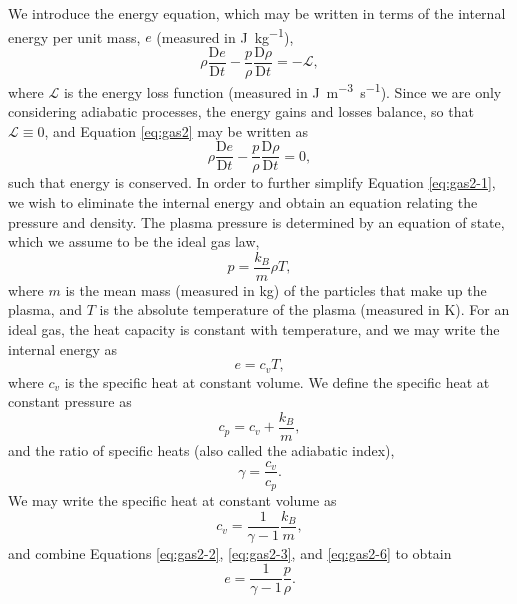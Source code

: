 We introduce the energy equation, which may be written in terms of the internal energy per unit mass, $e$ (measured in \si{J.kg^{-1}}),
%
\begin{equation}
\label{eq:gas2}
\rho \frac{\mathrm{D} e}{\mathrm{D} t} - \frac{p}{\rho} \frac{\mathrm{D} \rho}{\mathrm{D} t} = - \mathcal{L},
\end{equation}
%
where $\mathcal{L}$ is the energy loss function (measured in \si{J.m^{-3}.s^{-1}}).
Since we are only considering adiabatic processes, the energy gains and losses balance, so that $\mathcal{L} \equiv 0$, and Equation \eqref{eq:gas2} may be written as
%
\begin{equation}
\label{eq:gas2-1}
\rho \frac{\mathrm{D} e}{\mathrm{D} t} - \frac{p}{\rho} \frac{\mathrm{D} \rho}{\mathrm{D} t} = 0,
\end{equation}
%
such that energy is conserved.
In order to further simplify Equation \eqref{eq:gas2-1}, we wish to eliminate the internal energy and obtain an equation relating the pressure and density.
The plasma pressure is determined by an equation of state, which we assume to be the ideal gas law,
%
\begin{equation}
\label{eq:gas2-2}
p = \frac{k_B}{m} \rho T,
\end{equation}
%
where $m$ is the mean mass (measured in \si{kg}) of the particles that make up the plasma, and $T$ is the absolute temperature of the plasma (measured in \si{K}).
For an ideal gas, the heat capacity is constant with temperature, and we may write the internal energy as 
%
\begin{equation}
\label{eq:gas2-3}
e = c_v T,
\end{equation}
%
where $c_v$ is the specific heat at constant volume.
We define the specific heat at constant pressure as
%
\begin{equation}
\label{eq:gas2-4}
c_p = c_v + \frac{k_B}{m},
\end{equation}
%
and the ratio of specific heats (also called the adiabatic index),
%
\begin{equation}
\label{eq:gas2-5}
\gamma = \frac{c_v}{c_p}.
\end{equation}
%
We may write the specific heat at constant volume as
%
\begin{equation}
\label{eq:gas2-6}
c_v = \frac{1}{\gamma - 1} \frac{k_B}{m},
\end{equation}
%
and combine Equations \eqref{eq:gas2-2}, \eqref{eq:gas2-3}, and \eqref{eq:gas2-6} to obtain
%
\begin{equation}
\label{eq:gas2-7}
e = \frac{1}{\gamma - 1} \frac{p}{\rho}.
\end{equation}
